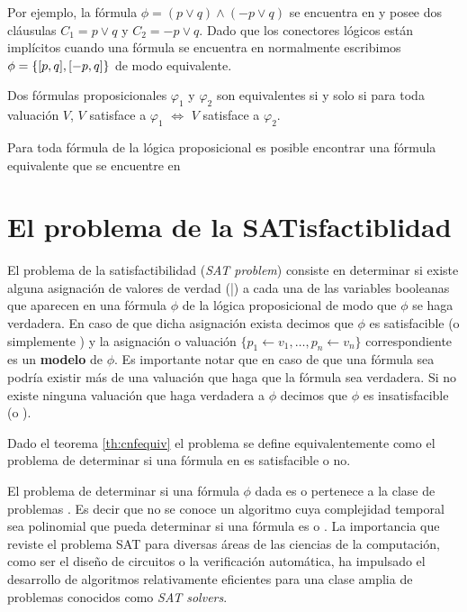 Por ejemplo, la fórmula $\phi = (p \vee q) \wedge (-p \vee q)$ se encuentra
en \cnf y posee dos cláusulas $C_1 = p \vee q$ y $C_2 = -p \vee q$. Dado que los
conectores lógicos están implícitos cuando una fórmula se encuentra en \cnf
normalmente escribimos $\phi = \{[p, q], [-p, q]\}$ de modo equivalente.

\begin{definition}
 Dos fórmulas proposicionales $\varphi_1$ y $\varphi_2$ son equivalentes si y solo si para toda valuación $V$, $V$ satisface a $\varphi_1$ $\Longleftrightarrow$ $V$ satisface a $\varphi_2$.
\end{definition}

\begin{theorem}\label{th:cnfequiv}
Para toda fórmula de la lógica proposicional es posible encontrar una fórmula equivalente que se encuentre en \cnf
\end{theorem}

\section{El problema de la SATisfactiblidad}

El problema de la satisfactibilidad (\emph{SAT problem}) consiste en determinar
si existe alguna asignación de valores de verdad (\true|\false) a cada una de
las variables booleanas que aparecen en una fórmula $\phi$ de la lógica
proposicional de modo que $\phi$ se haga verdadera. En caso de que dicha
asignación exista decimos que $\phi$ es satisfacible (o simplemente \sat) y la
asignación o valuación $\{ p_1 \leftarrow v_1, \ldots, p_n \leftarrow v_n \}$
correspondiente es un \textbf{modelo} de $\phi$. Es importante notar que en caso
de que una fórmula sea \sat podría existir más de una valuación que haga que la
fórmula sea verdadera. Si no existe ninguna valuación que haga verdadera a
$\phi$ decimos que $\phi$ es insatisfacible (o \unsat).

Dado el teorema \ref{th:cnfequiv} el problema \sat se define equivalentemente
como el problema de determinar si una fórmula en \cnf es satisfacible o no.

El problema de determinar si una fórmula $\phi$ dada es \sat o \unsat pertenece
a la clase de problemas \npc\cite{Cook:1971:CTP:800157.805047}. Es decir que no
se conoce un algoritmo cuya complejidad temporal sea polinomial que pueda determinar si una fórmula es \sat
o \unsat. La importancia que reviste el problema SAT para diversas áreas de las
ciencias de la computación, como ser el diseño de circuitos o la verificación
automática, ha impulsado el desarrollo de algoritmos relativamente eficientes
para una clase amplia de problemas conocidos como \emph{SAT solvers}.

